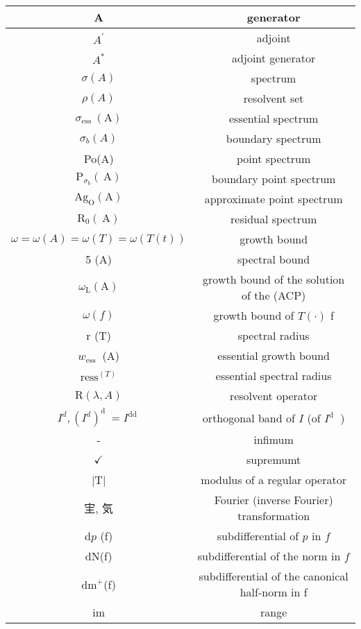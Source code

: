 \begin{tabular}{|c|c|}
\hline A & generator \\
\hline $A^{\prime}$ & adjoint \\
\hline $A^{*}$ & adjoint generator \\
\hline $\sigma(A)$ & spectrum \\
\hline $\rho(A)$ & resolvent set \\
\hline $\sigma_{\text {ess }}(\mathrm{A})$ & essential spectrum \\
\hline $\sigma_{b}(A)$ & boundary spectrum \\
\hline Po(A) & point spectrum \\
\hline $\mathrm{P}_{\sigma_{b}}(\mathrm{~A})$ & boundary point spectrum \\
\hline $\mathrm{Ag}_{\mathrm{O}}(\mathrm{A})$ & approximate point spectrum \\
\hline $\mathrm{R}_{0}(\mathrm{~A})$ & residual spectrum \\
\hline $\omega=\omega(A)=\omega(T)=\omega(T(t))$ & growth bound \\
\hline 5 (A) & spectral bound \\
\hline $\omega_{\mathrm{L}}(\mathrm{A})$ & growth bound of the solution of the (ACP) \\
\hline $\omega(f)$ & growth bound of $T(\cdot)$ f \\
\hline r (T) & spectral radius \\
\hline $w_{\text {ess }}$ (A) & essential growth bound \\
\hline $\mathrm{ress}^{(T)}$ & essential spectral radius \\
\hline $\mathrm{R}(\lambda, A)$ & resolvent operator \\
\hline $I^{d},\left(I^{d}\right)^{\text {d }}=I^{\text {dd }}$ & orthogonal band of $I$ (of $I^{\text {d }}$ ) \\
\hline - & infimum \\
\hline $\checkmark$ & supremumt \\
\hline |T| & modulus of a regular operator \\
\hline 宔, 気 & Fourier (inverse Fourier) transformation \\
\hline $\mathrm{d} p$ (f) & subdifferential of $p$ in $f$ \\
\hline dN(f) & subdifferential of the norm in $f$ \\
\hline $\mathrm{dm}^{+}$(f) & subdifferential of the canonical half-norm in f \\
\hline im & range \\

\end{tabular}
